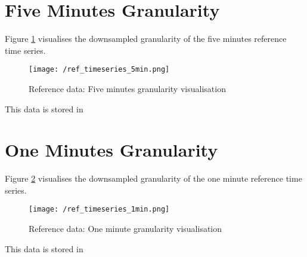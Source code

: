 \clearpage
\section{Five Minutes Granularity}

Figure \ref{fig:ref_ts_5_m_granularity} visualises the downsampled granularity of the five minutes reference time series.

\begin{figure}[h!]
	\texttt{[image: /ref\_timeseries\_5min.png]}
	\caption{Reference data: Five minutes granularity visualisation}
	\label{fig:ref_ts_5_m_granularity}
\end{figure}

This data is stored in 



\clearpage
\section{One Minutes Granularity}

Figure \ref{fig:ref_ts_1_m_granularity} visualises the downsampled granularity of the one minute reference time series.

\begin{figure}[h!]
	\texttt{[image: /ref\_timeseries\_1min.png]}
	\caption{Reference data: One minute granularity visualisation}
	\label{fig:ref_ts_1_m_granularity}
\end{figure}

This data is stored in 



